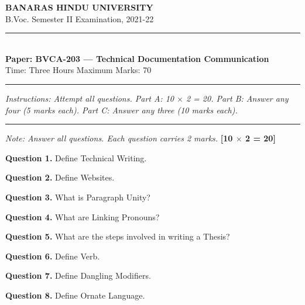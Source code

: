 \documentclass[11pt,a4paper]{article}
\begin{document}
\begin{center}
  {\large\bfseries BANARAS HINDU UNIVERSITY}\\[2pt]
  {
\normalsize B.Voc. Semester II Examination, 2021-22}\\[6pt]
  \rule{0.8\linewidth}{0.5pt}\\[6pt]
  {\large\bfseries Paper: BVCA-203 --- Technical Documentation Communication}\\[4pt]
  {
\normalsize Time: Three Hours \hfill Maximum Marks: 70}
\end{center}

\rule{\linewidth}{0.4pt}

\smallskip
\smallskip



\noindent   \textit{Instructions: Attempt all questions. Part A: 10 $ \times$ 2 = 20. Part B: Answer any four (5 marks each). Part C: Answer any three (10 marks each).}

\bigskip

\bigskip


\rule{\linewidth}{0.4pt}\smallskip




\noindent   \textit{Note: Answer all questions. Each question carries 2 marks.} \hfill   \textbf{[10 $ \times$ 2 = 20]}

\medskip


\noindent   \textbf{Question 1.} Define Technical Writing.

\medskip


\noindent   \textbf{Question 2.} Define Websites.

\medskip


\noindent   \textbf{Question 3.} What is Paragraph Unity?

\medskip


\noindent   \textbf{Question 4.} What are Linking Pronouns?

\medskip


\noindent   \textbf{Question 5.} What are the steps involved in writing a Thesis?

\medskip


\noindent   \textbf{Question 6.} Define Verb.

\medskip


\noindent   \textbf{Question 7.} Define Dangling Modifiers.

\medskip


\noindent   \textbf{Question 8.} Define Ornate Language.
\end{document}
